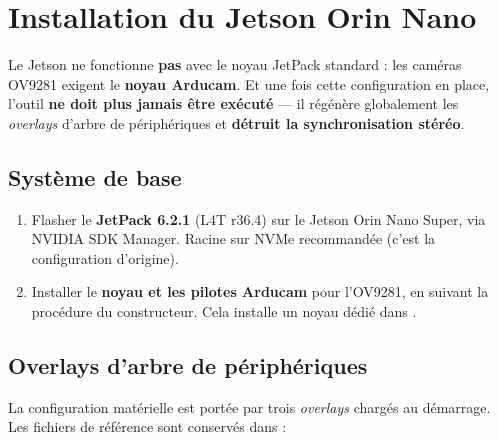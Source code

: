 \documentclass[11pt,a4paper]{article}
\begin{document}
\newpage
\section{Installation du Jetson Orin Nano}

\begin{avertissement}
Le Jetson ne fonctionne \textbf{pas} avec le noyau JetPack standard : les caméras OV9281
exigent le \textbf{noyau Arducam}. Et une fois cette configuration en place, l'outil
 \textbf{ne doit plus jamais être exécuté} — il régénère globalement
les \emph{overlays} d'arbre de périphériques et \textbf{détruit la synchronisation stéréo}.
\end{avertissement}

\subsection{Système de base}

\begin{enumerate}
  \item Flasher le \textbf{JetPack 6.2.1} (L4T r36.4) sur le Jetson Orin Nano Super, via
        NVIDIA SDK Manager. Racine sur NVMe recommandée (c'est la configuration d'origine).
  \item Installer le \textbf{noyau et les pilotes Arducam} pour l'OV9281, en suivant la
        procédure du constructeur. Cela installe un noyau dédié dans
        .
\end{enumerate}

\subsection{Overlays d'arbre de périphériques}

La configuration matérielle est portée par trois \emph{overlays} chargés au démarrage. Les
fichiers de référence sont conservés dans  :
\end{document}
